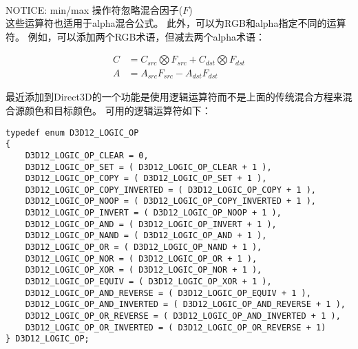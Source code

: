 \begin{flushleft}
~\\
NOTICE: min/max 操作符忽略混合因子($F$)
~\\

这些运算符也适用于alpha混合公式。 此外，可以为RGB和alpha指定不同的运算符。 例如，可以添加两个RGB术语，但减去两个alpha术语：\\
\end{flushleft}

\begin{align*}
C&=C_{src}\bigotimes F_{src}+C_{dst}\bigotimes F_{dst}\\
A&=A_{src}F_{src}-A_{dst}F_{dst}
\end{align*}

\begin{flushleft}
最近添加到Direct3D的一个功能是使用逻辑运算符而不是上面的传统混合方程来混合源颜色和目标颜色。 可用的逻辑运算符如下：\\
\end{flushleft}

\begin{lstlisting}
typedef enum D3D12_LOGIC_OP
{
    D3D12_LOGIC_OP_CLEAR = 0,
    D3D12_LOGIC_OP_SET = ( D3D12_LOGIC_OP_CLEAR + 1 ),
    D3D12_LOGIC_OP_COPY = ( D3D12_LOGIC_OP_SET + 1 ),
    D3D12_LOGIC_OP_COPY_INVERTED = ( D3D12_LOGIC_OP_COPY + 1 ),
    D3D12_LOGIC_OP_NOOP = ( D3D12_LOGIC_OP_COPY_INVERTED + 1 ),
    D3D12_LOGIC_OP_INVERT = ( D3D12_LOGIC_OP_NOOP + 1 ),
    D3D12_LOGIC_OP_AND = ( D3D12_LOGIC_OP_INVERT + 1 ),
    D3D12_LOGIC_OP_NAND = ( D3D12_LOGIC_OP_AND + 1 ),
    D3D12_LOGIC_OP_OR = ( D3D12_LOGIC_OP_NAND + 1 ),
    D3D12_LOGIC_OP_NOR = ( D3D12_LOGIC_OP_OR + 1 ),
    D3D12_LOGIC_OP_XOR = ( D3D12_LOGIC_OP_NOR + 1 ),
    D3D12_LOGIC_OP_EQUIV = ( D3D12_LOGIC_OP_XOR + 1 ),
    D3D12_LOGIC_OP_AND_REVERSE = ( D3D12_LOGIC_OP_EQUIV + 1 ),
    D3D12_LOGIC_OP_AND_INVERTED = ( D3D12_LOGIC_OP_AND_REVERSE + 1 ),
    D3D12_LOGIC_OP_OR_REVERSE = ( D3D12_LOGIC_OP_AND_INVERTED + 1 ),
    D3D12_LOGIC_OP_OR_INVERTED = ( D3D12_LOGIC_OP_OR_REVERSE + 1)
} D3D12_LOGIC_OP;
\end{lstlisting}

